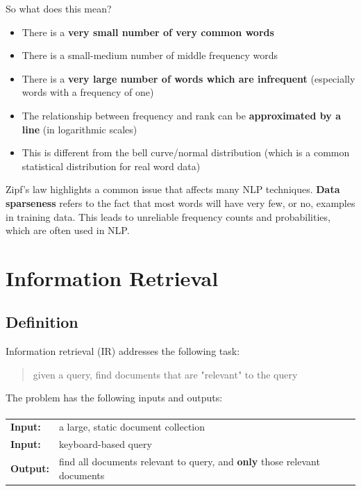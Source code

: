 \documentclass{article}
\begin{document}
So what does this mean?
\begin{itemize}
	\item There is a \textbf{very small number of very common words}
	\item There is a small-medium number of middle frequency words
	\item There is a \textbf{very large number of words which are infrequent} (especially words with a frequency of one)
	\item The relationship between frequency and rank can be \textbf{approximated by a line} (in logarithmic scales)
	\item This is different from the bell curve/normal distribution (which is a common statistical distribution for real word data)
\end{itemize}

Zipf's law highlights a common issue that affects many NLP techniques. \textbf{Data sparseness} refers to the fact that most words will have very few, or no, examples in training data. This leads to unreliable frequency counts and probabilities, which are often used in NLP.

\section{Information Retrieval}

\subsection{Definition}

Information retrieval (IR) addresses the following task:
\begin{quote}
	given a query, find documents that are "relevant" to the query
\end{quote}

The problem has the following inputs and outputs:
\paragraph{} \begin{tabular}{ll}
	\textbf{Input:} & a large, static document collection \\
	\textbf{Input:} & keyboard-based query \\
	\textbf{Output:} & find all documents relevant to query, and \textbf{only} those relevant documents \\
\end{tabular}
\end{document}
